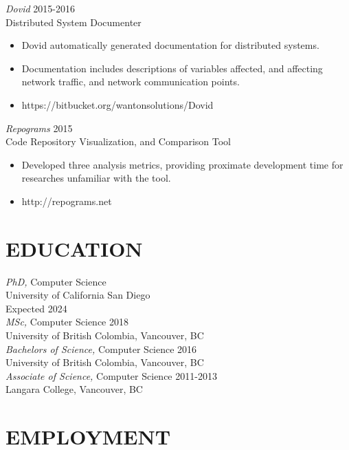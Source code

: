 \documentclass[line,margin]{res}
\begin{document}
\begin{resume}
{{\sl Dovid} \hfill 2015-2016\\
    Distributed System Documenter
\begin{itemize} \itemsep -2pt
        \item Dovid automatically generated documentation for distributed systems.
        \item Documentation includes descriptions of variables affected, and affecting network traffic, and network communication points.
        \item https://bitbucket.org/wantonsolutions/Dovid
\end{itemize}

{\sl Repograms} \hfill 2015\\
	Code Repository Visualization, and Comparison Tool
\begin{itemize} \itemsep -2pt
        \item Developed three analysis metrics, providing proximate development time for researches unfamiliar with the tool.
		\item http://repograms.net
\end{itemize}


\section{EDUCATION}
{\sl PhD,} Computer Science \\
University of California San Diego \\
Expected 2024 \\

{\sl MSc,} Computer Science \hfill 2018 \\
University of British Colombia, Vancouver, BC \\

{\sl Bachelors of Science,} Computer Science	\hfill 2016\\
University of British Colombia, Vancouver, BC \\

{\sl Associate of Science,} Computer Science \hfill 2011-2013\\
Langara College, Vancouver, BC\\


\section{EMPLOYMENT} 

}
\end{resume}
\end{document}
